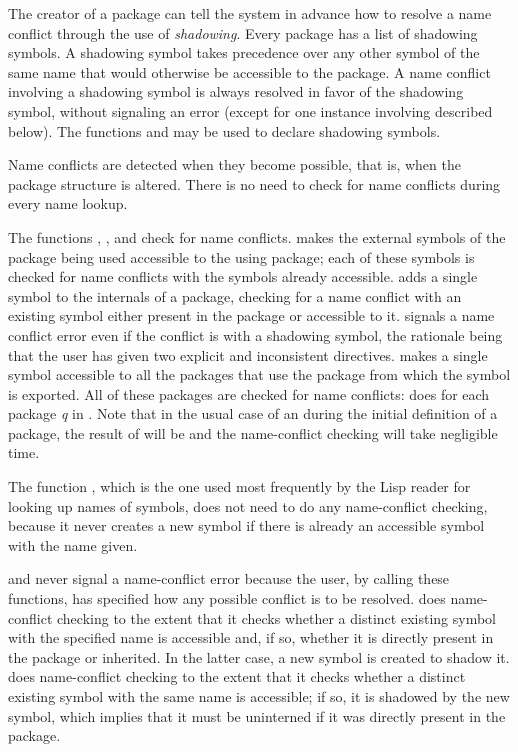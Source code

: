 The creator of a package can tell the system in advance how to resolve a
name conflict through the use of \emph{shadowing}.  Every package has a
list of shadowing symbols.  A shadowing symbol takes precedence over any
other symbol of the same name that would otherwise be accessible to the
package.  A name conflict involving a shadowing symbol is always
resolved in favor of the shadowing symbol, without signaling an error
(except for one instance involving  described below).  The
functions  and  may be used to declare
shadowing symbols.

Name conflicts are detected when they become possible, that is, when the
package structure is altered.  There is no need to check for name
conflicts during every name lookup.

The functions , , and  check for name
conflicts.   makes the external symbols of the package
being used accessible to the using package; each of these symbols is
checked for name conflicts with the symbols already accessible.
 adds a single symbol to the internals of a package, checking
for a name conflict with an existing symbol either present in the
package or accessible to it.   signals a name conflict error
even if the conflict is with a shadowing symbol, the rationale being
that the user has given two explicit and inconsistent directives.
 makes a single
symbol accessible to all the packages that use the package from which
the symbol is exported.  All of these packages are checked for
name conflicts:   does
 for each package \emph{q}
in .  Note that in the usual case of
an  during the initial definition of a package, the
result of 
will be {\false} and the name-conflict checking
will take negligible time.

The function , which is the one used most
frequently by the Lisp reader for looking up names of symbols,
does not need to do any name-conflict checking, because it
never creates a new symbol if there is already an accessible symbol with
the name given.

 and  never signal a name-conflict error
because the user, by calling these functions, has specified how any
possible conflict is to be resolved.   does name-conflict
checking to the extent that it checks whether a distinct existing symbol with
the specified name is accessible and, if so, whether it is directly
present in the package or inherited.  In the latter case, a new symbol
is created to shadow it.   does name-conflict
checking to the extent that it checks whether a distinct existing
symbol with the same name is accessible; if so, it is shadowed by
the new symbol, which implies that it must be uninterned
if it was directly present in the package.

